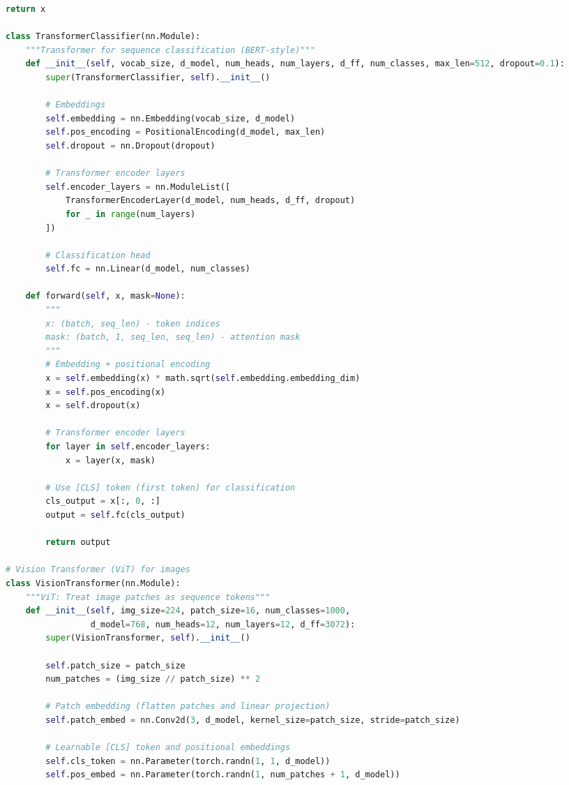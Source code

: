 \documentclass[8pt,landscape]{article}
\begin{document}
\begin{multicols}{3}
\begin{lstlisting}[language=Python]
        return x

class TransformerClassifier(nn.Module):
    """Transformer for sequence classification (BERT-style)"""
    def __init__(self, vocab_size, d_model, num_heads, num_layers, d_ff, num_classes, max_len=512, dropout=0.1):
        super(TransformerClassifier, self).__init__()

        # Embeddings
        self.embedding = nn.Embedding(vocab_size, d_model)
        self.pos_encoding = PositionalEncoding(d_model, max_len)
        self.dropout = nn.Dropout(dropout)

        # Transformer encoder layers
        self.encoder_layers = nn.ModuleList([
            TransformerEncoderLayer(d_model, num_heads, d_ff, dropout)
            for _ in range(num_layers)
        ])

        # Classification head
        self.fc = nn.Linear(d_model, num_classes)

    def forward(self, x, mask=None):
        """
        x: (batch, seq_len) - token indices
        mask: (batch, 1, seq_len, seq_len) - attention mask
        """
        # Embedding + positional encoding
        x = self.embedding(x) * math.sqrt(self.embedding.embedding_dim)
        x = self.pos_encoding(x)
        x = self.dropout(x)

        # Transformer encoder layers
        for layer in self.encoder_layers:
            x = layer(x, mask)

        # Use [CLS] token (first token) for classification
        cls_output = x[:, 0, :]
        output = self.fc(cls_output)

        return output

# Vision Transformer (ViT) for images
class VisionTransformer(nn.Module):
    """ViT: Treat image patches as sequence tokens"""
    def __init__(self, img_size=224, patch_size=16, num_classes=1000,
                 d_model=768, num_heads=12, num_layers=12, d_ff=3072):
        super(VisionTransformer, self).__init__()

        self.patch_size = patch_size
        num_patches = (img_size // patch_size) ** 2

        # Patch embedding (flatten patches and linear projection)
        self.patch_embed = nn.Conv2d(3, d_model, kernel_size=patch_size, stride=patch_size)

        # Learnable [CLS] token and positional embeddings
        self.cls_token = nn.Parameter(torch.randn(1, 1, d_model))
        self.pos_embed = nn.Parameter(torch.randn(1, num_patches + 1, d_model))


\end{lstlisting}
\end{multicols}
\end{document}
